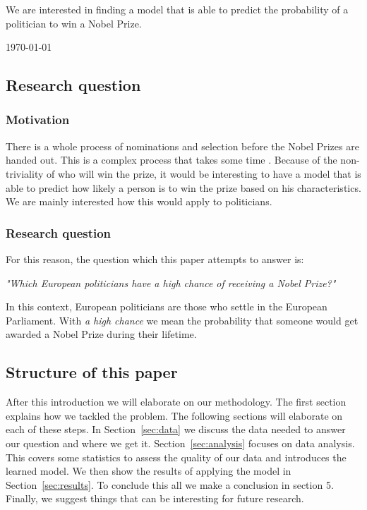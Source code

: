 \documentclass[11pt,journal,compsoc]{IEEEtran}
\begin{document}
We are interested in finding a model that is able to predict the probability of a politician to win a Nobel Prize.


\hfill \today

\subsection{Research question}
\subsubsection{Motivation}
There is a whole process of nominations and selection before the Nobel Prizes are handed out. This is a complex process that takes some time \cite{nobelNomination}.
Because of the non-triviality of who will win the prize, it would be interesting to have a model that is able to predict how likely a person is to win the prize based on his characteristics. We are mainly interested how this would apply to politicians. 
\subsubsection{Research question}
\par For this reason, the question which this paper attempts to answer is:
\begin{center}
\textit{"Which European politicians have a high chance of receiving a Nobel Prize?"}	
\end{center}
In this context, European politicians are those who settle in the European Parliament. With \textit{a high chance} we mean the probability that someone would get awarded a Nobel Prize during their lifetime.

\subsection{Structure of this paper}
After this introduction we will elaborate on our methodology. The first section explains how we tackled the problem. The following sections will elaborate on each of these steps. In Section~\ref{sec:data} we discuss the data needed to answer our question and where we get it. 
Section~\ref{sec:analysis} focuses on data analysis. This covers some statistics to assess the quality of our data and introduces the learned model. We then show the results of applying the model in Section~\ref{sec:results}. To conclude this all we make a conclusion in section 5. Finally, we suggest things that can be interesting for future research.
\end{document}
